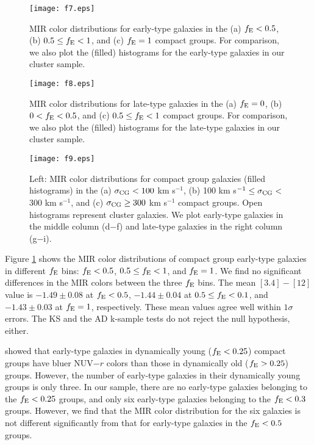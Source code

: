 \documentclass[12pt,preprint,apj]{emulateapj}
\newcommand{\efrac}{f_{\rm E}}
\begin{document}
\begin{figure}[h]
\centering
\texttt{[image: f7.eps]}
\caption{
MIR color distributions for early-type galaxies in the (a) $\efrac<0.5$, 
(b) $0.5\leq\efrac<1$, and (c) $\efrac=1$ compact groups.
For comparison, we also plot the (filled) histograms for the early-type galaxies 
in our cluster sample. 
}
\label{w13_efrac_egal}
\end{figure}

\begin{figure}[ht]
\centering
\texttt{[image: f8.eps]}
\caption{
MIR color distributions for late-type galaxies in the (a) $\efrac=0$,
(b) $0<\efrac<0.5$, and (c) $0.5\leq\efrac<1$ compact groups. 
For comparison, we also plot the (filled) histograms for the late-type galaxies 
in our cluster sample.}
\label{w13_efrac_lgal}
\end{figure}


\begin{figure*}
\centering
\texttt{[image: f9.eps]}
\caption{
Left: MIR color distributions for compact group galaxies (filled histograms) 
in the (a) $\sigma_{\rm CG}<100$ km s$^{-1}$, 
(b) 100 km s$^{-1} \leq \sigma_{\rm CG} <$ 300 km s$^{-1}$, 
and (c) $\sigma_{\rm CG}\geq300$ km s$^{-1}$ compact groups.
Open histograms represent cluster galaxies. 
We plot early-type galaxies in the middle column (d$-$f) and 
late-type galaxies in the right column (g$-$i).
}
\label{w13abhist_vdispcg}
\end{figure*}



Figure \ref{w13_efrac_egal} shows the MIR color distributions 
of compact group early-type galaxies in different $\efrac$ bins: $\efrac<0.5$, 
$0.5\leq\efrac<1$, and $\efrac=1$. 
We find no significant differences in the MIR colors between the three $\efrac$ bins.
The mean $[3.4]-[12]$ value is $-1.49\pm0.08$ at $\efrac<0.5$, 
$-1.44\pm0.04$ at $0.5\leq\efrac<0.1$, and $-1.43\pm0.03$ at $\efrac=1$, respectively. 
These mean values agree well within $1\sigma$ errors. 
The KS and the AD k-sample tests do not reject the null hypothesis, either.

\citet{bitsakis+11} showed that early-type galaxies in dynamically young
($\efrac<0.25$) compact groups have bluer NUV$-r$ colors than
those in dynamically old ($\efrac>0.25$) groups. 
However, the number of early-type galaxies 
in their dynamically young groups is only three. 
In our sample, there are no early-type galaxies belonging to the $\efrac<0.25$ groups, 
and only six early-type galaxies belonging to the $\efrac<0.3$ groups. 
However, we find that the MIR color distribution for the six galaxies is 
not different significantly from that for early-type galaxies in the $\efrac<0.5$ groups.
\end{document}
